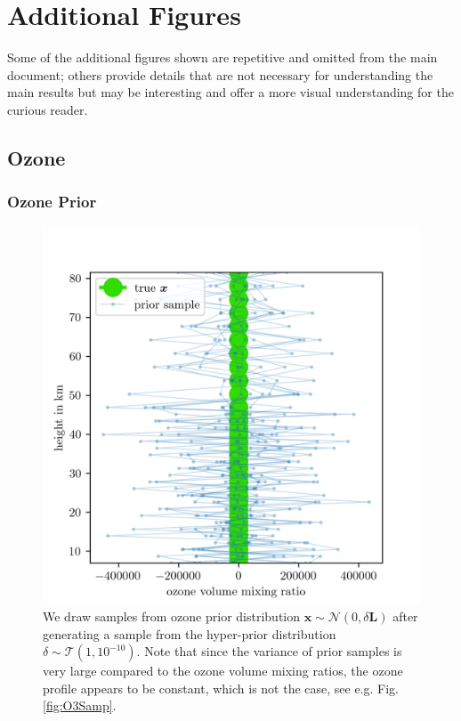 \chapter{Additional Figures}
\label{ap:addFig}
Some of the additional figures shown are repetitive and omitted from the main document; others provide details that are not necessary for understanding the main results but may be interesting and offer a more visual understanding for the curious reader.
\clearpage
\section{Ozone}
\subsection{Ozone Prior}
\begin{figure}[ht!]
	\centering
	\includegraphics{OzonePrior.png}
	\caption[Samples from ozone prior distribution.]{We draw samples from ozone prior distribution $\bm{x} \sim \mathcal{N}(0,\delta \bm{L})$ after generating a sample from the hyper-prior distribution $\delta \sim \mathcal{T}(1,10^{-10})$. Note that since the variance of prior samples is very large compared to the ozone volume mixing ratios, the ozone profile appears to be constant, which is not the case, see e.g. Fig. \ref{fig:O3Samp}.}
	\label{fig:O3Prior}
\end{figure}
\clearpage
